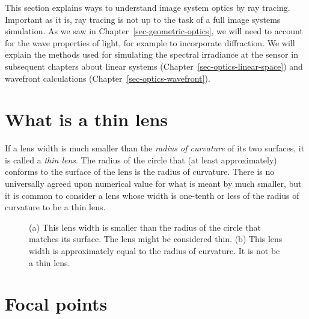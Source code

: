 \documentclass[
  letterpaper,
]{book}
\begin{document}
This section explains ways to understand image system optics by ray
tracing. Important as it is, ray tracing is not up to the task of a full
image systems simulation. As we saw in
Chapter~\ref{sec-geometric-optics}, we will need to account for the wave
properties of light, for example to incorporate diffraction. We will
explain the methods used for simulating the spectral irradiance at the
sensor in subsequent chapters about linear systems
(Chapter~\ref{sec-optics-linear-space}) and wavefront calculations
(Chapter~\ref{sec-optics-wavefront}).

\section{What is a thin lens}\label{sec-optics-thinlensdefined}

If a lens width is much smaller than the \emph{radius of curvature} of
its two surfaces, it is called a \emph{thin lens}. The radius of the
circle that (at least approximately) conforms to the surface of the lens
is the radius of curvature. There is no universally agreed upon
numerical value for what is meant by much smaller, but it is common to
consider a lens whose width is one-tenth or less of the radius of
curvature to be a thin lens.

\begin{figure}


\caption{\label{fig-thinlens-definition}(a) This lens width is smaller
than the radius of the circle that matches its surface. The lens might
be considered thin. (b) This lens width is approximately equal to the
radius of curvature. It is not be a thin lens.}

\end{figure}%

\section{Focal points}\label{sec-optics-focalpoints}
\end{document}
